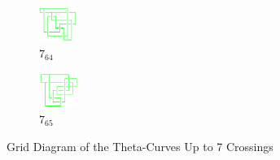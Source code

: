\documentclass{article}
\theoremstyle{definition}
\theoremstyle{theorem}
\theoremstyle{proposition}
\theoremstyle{corollary}
\begin{document}
\begin{figure}[H]
\begin{subfigure}{0.075\textwidth}
    \includegraphics[width=1.25cm]{../Midterm_Poster/grid_diagram/theta_7_64.png}
    \caption{$7_{64}$} 
    \end{subfigure}
    \begin{subfigure}{0.075\textwidth}
    \includegraphics[width=1.25cm]{../Midterm_Poster/grid_diagram/theta_7_65.png}
    \caption{$7_{65}$} 
    \end{subfigure}
    \caption{Grid Diagram of the Theta-Curves Up to 7 Crossings}
  \end{figure}
\end{document}
